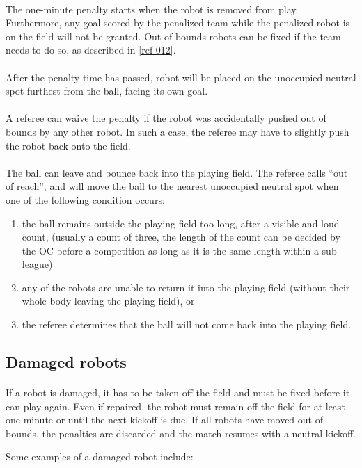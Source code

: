 \documentclass{article}
\newcommand*{\p}{\paragraph{}}
\begin{document}
\p The one-minute penalty starts when the robot is removed from play. Furthermore,
any goal scored by the penalized team while the penalized robot is on the field
will not be granted. Out-of-bounds robots can be fixed if the team needs to do
so, as described in \hyperref[ref-012]{\ref{ref-012}}.

\p After the penalty time has passed, robot will be placed on the unoccupied
neutral spot furthest from the ball, facing its own goal.

\p A referee can waive the penalty if the robot was accidentally pushed out of
bounds by any other robot. In such a case, the
referee may have to slightly push the robot back onto the field.

\p The ball can leave and bounce back into the playing field. The referee calls
``out of reach'', and will move the ball to the nearest unoccupied neutral spot
when one of the following condition occurs:

\begin{enumerate}
    \item the ball remains outside the playing field too long,
        after a visible and loud count, (usually a count of
        three, the length of the count can be decided by the OC 
        before a competition as long as it is the same length 
        within a sub-league)

    \item any of the robots are unable to return it into the playing field
        (without their whole body leaving the playing field), or

    \item the referee determines that the ball will not come back into the
        playing field.

\end{enumerate}

\subsection{Damaged robots \label{ref-012}}

\p If a robot is damaged, it has to be taken off the field and must be fixed
before it can play again. Even if repaired, the robot must remain off the field
for at least one minute or until the next kickoff is due. If all robots have
moved out of bounds, the penalties are discarded and the match resumes with a
neutral kickoff.

Some examples of a damaged robot include:
\end{document}
